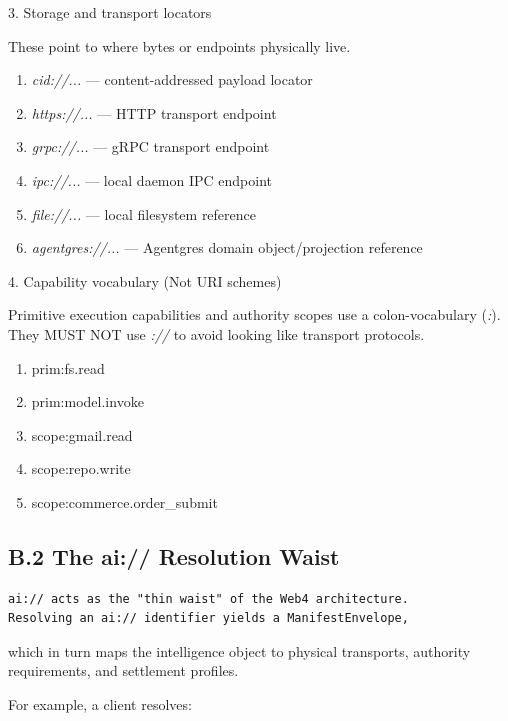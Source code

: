\documentclass[
  11pt,
]{article}
\providecommand{\tightlist}{%
  \setlength{\itemsep}{0pt}\setlength{\parskip}{0pt}}
\begin{document}
3. Storage and transport locators

These point to where bytes or endpoints physically live.

\begin{enumerate}
\def\labelenumi{\arabic{enumi}.}
\tightlist
\item
  \emph{cid://...} --- content-addressed payload locator
\item
  \emph{https://...} --- HTTP transport endpoint
\item
  \emph{grpc://...} --- gRPC transport endpoint
\item
  \emph{ipc://...} --- local daemon IPC endpoint
\item
  \emph{file://...} --- local filesystem reference
\item
  \emph{agentgres://...} --- Agentgres domain object/projection
  reference
\end{enumerate}

4. Capability vocabulary (Not URI schemes)

Primitive execution capabilities and authority scopes use a
colon-vocabulary (\emph{:}). They MUST NOT use \emph{://} to avoid
looking like transport protocols.

\begin{enumerate}
\def\labelenumi{\arabic{enumi}.}
\tightlist
\item
  prim:fs.read
\item
  prim:model.invoke
\item
  scope:gmail.read
\item
  scope:repo.write
\item
  scope:commerce.order\_submit
\end{enumerate}

\hypertarget{b.2-the-ai-resolution-waist}{%
\subsection{B.2 The ai:// Resolution
Waist}\label{b.2-the-ai-resolution-waist}}

\begin{lstlisting}[language=rustioi]
ai:// acts as the "thin waist" of the Web4 architecture.
Resolving an ai:// identifier yields a ManifestEnvelope,
\end{lstlisting}
which in turn maps the intelligence object to physical transports,
authority requirements, and settlement profiles.

For example, a client resolves:
\end{document}
